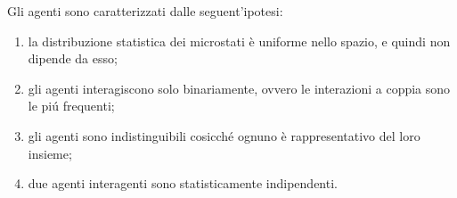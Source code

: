                 \begin{ipo}
                    \label{ipTipoBolztmann}
                    Gli agenti sono caratterizzati dalle seguent'ipotesi:

                    \begin{enumerate}[
                        label=B\arabic*,
                    ]
                        \item\label{ipTipoBoltzmannDensitàOmogenea} la distribuzione statistica dei microstati è uniforme nello spazio, e quindi non dipende da esso;
                        \item\label{ipTipoBoltzmannInterazioniBinarie} gli agenti interagiscono solo binariamente, ovvero le interazioni a coppia sono le piú frequenti;
                        \item\label{ipTipoBoltzmannAgentiIndistinguibili} gli agenti sono indistinguibili cosicché ognuno è rappresentativo del loro insieme;
                        \item\label{ipTipoBoltzmannCaoMolecolare} due agenti interagenti sono statisticamente indipendenti.
                    \end{enumerate}
                \end{ipo}

